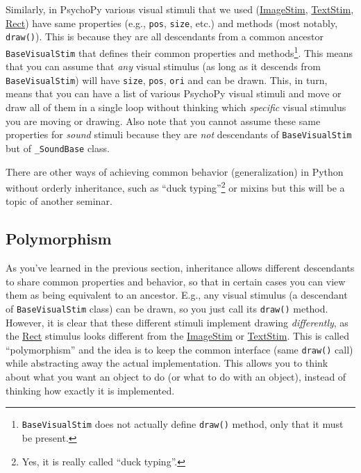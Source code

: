 \documentclass[
]{book}
\begin{document}
Similarly, in PsychoPy various visual stimuli that we used (\href{https://psychopy.org/api/visual/imagestim.html\#psychopy.visual.ImageStim}{ImageStim}, \href{https://psychopy.org/api/visual/textstim.html\#psychopy.visual.TextStim}{TextStim}, \href{https://psychopy.org/api/visual/rect.html\#psychopy.visual.rect.Rect}{Rect}) have same properties (e.g., \texttt{pos}, \texttt{size}, etc.) and methods (most notably, \texttt{draw()}). This is because they are all descendants from a common ancestor \texttt{BaseVisualStim} that defines their common properties and methods\footnote{\texttt{BaseVisualStim} does not actually define \texttt{draw()} method, only that it must be present.}. This means that you can assume that \emph{any} visual stimulus (as long as it descends from \texttt{BaseVisualStim}) will have \texttt{size}, \texttt{pos}, \texttt{ori} and can be drawn. This, in turn, means that you can have a list of various PsychoPy visual stimuli and move or draw all of them in a single loop without thinking which \emph{specific} visual stimulus you are moving or drawing. Also note that you cannot assume these same properties for \emph{sound} stimuli because they are \emph{not} descendants of \texttt{BaseVisualStim} but of \texttt{\_SoundBase} class.

There are other ways of achieving common behavior (generalization) in Python without orderly inheritance, such as ``duck typing''\footnote{Yes, it is really called ``duck typing''.} or mixins but this will be a topic of another seminar.

\hypertarget{polymorphism}{%
\subsection{Polymorphism}\label{polymorphism}}

As you've learned in the previous section, inheritance allows different descendants to share common properties and behavior, so that in certain cases you can view them as being equivalent to an ancestor. E.g., any visual stimulus (a descendant of \texttt{BaseVisualStim} class) can be drawn, so you just call its \texttt{draw()} method. However, it is clear that these different stimuli implement drawing \emph{differently}, as the \href{https://psychopy.org/api/visual/rect.html\#psychopy.visual.rect.Rect}{Rect} stimulus looks different from the \href{https://psychopy.org/api/visual/imagestim.html\#psychopy.visual.ImageStim}{ImageStim} or \href{https://psychopy.org/api/visual/textstim.html\#psychopy.visual.TextStim}{TextStim}. This is called ``polymorphism'' and the idea is to keep the common interface (same \texttt{draw()} call) while abstracting away the actual implementation. This allows you to think about what you want an object to do (or what to do with an object), instead of thinking how exactly it is implemented.
\end{document}
